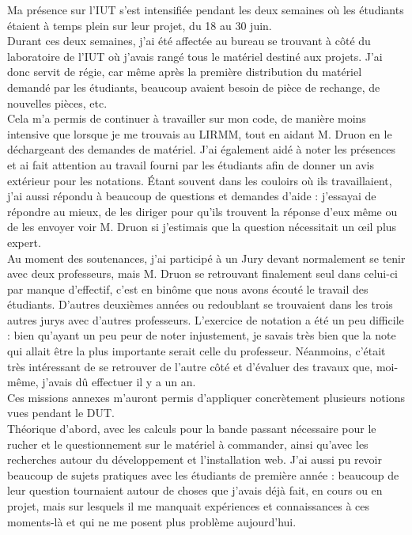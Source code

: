 \documentclass[11pt,french,a4paper]{report}
\begin{document}
Ma présence sur l'IUT s'est intensifiée pendant les deux semaines où les étudiants étaient à temps plein sur leur projet, du 18 au 30 juin. \\
Durant ces deux semaines, j'ai été affectée au bureau se trouvant à côté du laboratoire de l'IUT où j'avais rangé tous le matériel 
destiné aux projets.
J'ai donc servit de régie, car même après la première distribution du matériel demandé par les étudiants, beaucoup avaient 
besoin de pièce de rechange, de nouvelles pièces, etc. \\
Cela m'a permis de continuer à travailler sur mon code, de manière moins intensive que lorsque je me trouvais au LIRMM, tout en
aidant M. Druon en le déchargeant des demandes de matériel. 
J'ai également aidé à noter les présences et ai fait attention au travail fourni par les étudiants afin de donner un avis extérieur pour
les notations.
Étant souvent dans les couloirs où ils travaillaient, j'ai aussi répondu à beaucoup de questions et demandes d'aide : 
j'essayai de répondre au mieux, de les diriger pour qu'ils trouvent la réponse d'eux même ou de les envoyer voir M. Druon si 
j'estimais que la question nécessitait un œil plus expert. \\
Au moment des soutenances, j'ai participé à un Jury devant normalement se tenir avec deux professeurs, mais M. Druon se retrouvant 
finalement seul dans celui-ci par manque d'effectif, c'est en binôme que nous avons écouté le travail des étudiants.
D'autres deuxièmes années ou redoublant se trouvaient dans les trois autres jurys avec d'autres professeurs. 
L'exercice de notation a été un peu difficile : bien qu'ayant un peu peur de noter injustement,
je savais très bien que la note qui allait être la plus importante serait celle 
du professeur. Néanmoins, c'était très intéressant de se retrouver de l'autre côté et d'évaluer des travaux que, moi-même, 
j'avais dû effectuer il y a un an. \\
Ces missions annexes m'auront permis d'appliquer concrètement plusieurs notions vues pendant le DUT. \\
Théorique d'abord, avec les calculs pour la bande passant nécessaire pour le rucher et le questionnement sur le matériel à commander, ainsi
qu'avec les recherches autour du développement et l'installation web. 
J'ai aussi pu revoir beaucoup de sujets pratiques avec les étudiants de première année : beaucoup de leur question tournaient autour 
de choses que j'avais déjà fait, en cours ou en projet,  mais sur lesquels il me manquait expériences et connaissances à ces moments-là et
qui ne me posent plus problème aujourd'hui. \\
\end{document}
